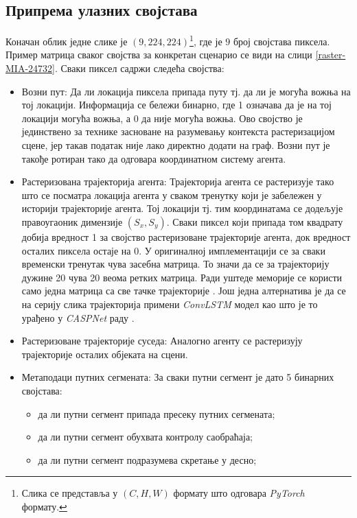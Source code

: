 \documentclass[11pt,oneside]{memoir}
\begin{document}
\subsection{Припрема улазних својстава}

Коначан облик једне слике је $(9, 224, 224)$\footnote{Слика се представља у $(C, H, W)$ формату што одговара \textit{PyTorch} формату.}, 
где је $9$ број својстава пиксела. Пример матрица сваког својства за конкретан сценарио се види на слици \ref{raster-MIA-24732}. 
Сваки пиксел садржи следећа својства:
\begin{itemize}
  \item Возни пут: Да ли локација пиксела припада путу тј. да ли је могућа вожња на тој локацији. Информација се бележи бинарно, где
        1 означава да је на тој локацији могућа вожња, а 0 да није могућа вожња. Ово својство је јединствено за технике
        засноване на разумевању контекста растеризацијом сцене, јер такав податак није лако директно додати на граф. 
        Возни пут је такође ротиран тако да одговара координатном систему агента.
  \item Растеризована трајекторија агента: Трајекторија агента се растеризује тако што се посматра локација агента
        у сваком тренутку који је забележен у историји трајекторије агента. Тој локацији тј. тим координатама се додељује
        правоугаоник димензије $(S_x, S_y)$. Сваки пиксел који припада том квадрату добија вредност 1 за својство растеризоване
        трајекторије агента, док вредност осталих пиксела остаје на 0. 
        У оригиналној имплементацији се за сваки временски тренутак чува засебна матрица. То значи да се за трајекторију дужине 20 
        чува 20 веома ретких матрица. Ради уштеде меморије се користи само једна матрица са све тачке трајекторије \cite{home}.
        Још једна алтернатива је да се на серију слика трајекторија примени \textit{ConvLSTM} модел као што је то урађено у \textit{CASPNet}
        раду \cite{caspnet}. 
  \item Растеризоване трајекторије суседа: Аналогно агенту се растеризују трајекторије осталих објеката на сцени.
  \item Метаподаци путних сегмената: За сваки путни сегмент је дато 5 бинарних својстава:
        \begin{itemize}
          \item да ли путни сегмент припада пресеку путних сегмената;
          \item да ли путни сегмент обухвата контролу саобраћаја;
          \item да ли путни сегмент подразумева скретање у десно;

\end{itemize}
\end{itemize}
\end{document}
